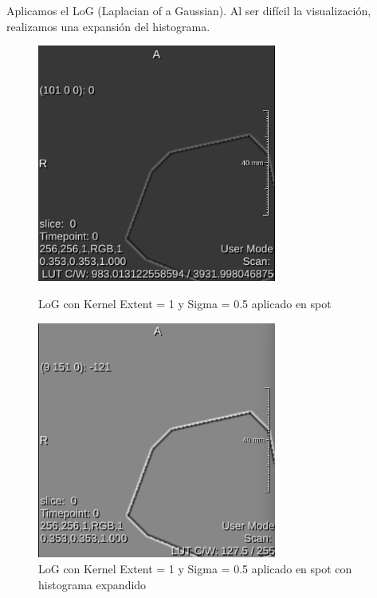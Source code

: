 \documentclass{article}
\begin{document}
Aplicamos el LoG (Laplacian of a Gaussian). Al ser difícil la visualización, realizamos una expansión del histograma.

\begin{figure}[ht]
\centering
\begin{minipage}{.5\textwidth}
  \centering
    \includegraphics[width=0.7\textwidth]{3Laplaciano/3_ker_1_sigma_5.png} %
    \caption{LoG con Kernel Extent = 1 y Sigma = 0.5 aplicado en spot}
    \label{fg:spot_1_5}
\end{minipage}%
\begin{minipage}{.5\textwidth}
  \centering
  \includegraphics[width=0.7\textwidth]{3Laplaciano/3_ker_1_sigma_5_scale.png}
  \caption{LoG con Kernel Extent = 1 y Sigma = 0.5 aplicado en spot con histograma expandido}
\label{fg:spot_1_5_scale}
\end{minipage}
\end{figure}
\FloatBarrier
\end{document}
